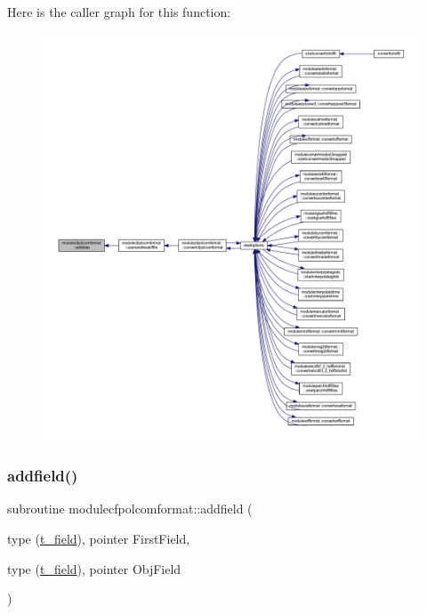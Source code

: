 Here is the caller graph for this function\+:\nopagebreak
\begin{figure}[H]
\begin{center}
\leavevmode
\includegraphics[width=350pt]{namespacemodulecfpolcomformat_a06c01fa0bdcd286b18e4131ebf80a3fe_icgraph}
\end{center}
\end{figure}
\mbox{\label{namespacemodulecfpolcomformat_aeffcbf4718c74837ddf588179800f544}} 
\subsubsection{\texorpdfstring{addfield()}{addfield()}}
{\footnotesize\ttfamily subroutine modulecfpolcomformat\+::addfield (\begin{DoxyParamCaption}\item[{type (\mbox{\hyperlink{structmodulecfpolcomformat_1_1t__field}{t\+\_\+field}}), pointer}]{First\+Field,  }\item[{type (\mbox{\hyperlink{structmodulecfpolcomformat_1_1t__field}{t\+\_\+field}}), pointer}]{Obj\+Field }\end{DoxyParamCaption})\hspace{0.3cm}{\ttfamily [private]}}

